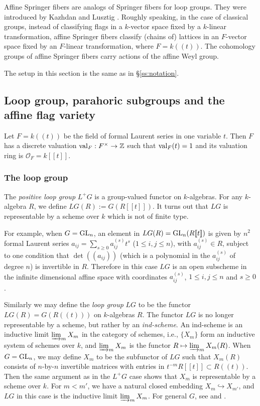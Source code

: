 \documentclass[]{pcmi}
\let\oldsubsubsection\subsubsection
\renewcommand{\subsubsection}[1]{%
\setcounter{subsubsection}{\value{equation}}%
\oldsubsubsection{#1}%
\refstepcounter{equation}%
}
\theoremstyle{plain}
\theoremstyle{definition}
\def\ZZ{\mathbb{Z}}
\def\calO{\mathcal{O}}
\newcommand{\val}{\textup{val}}
\newcommand\GL{\textup{GL}}
\newcommand{\incl}{\hookrightarrow}
\newcommand{\tl}[1]{[\![#1]\!]}
\newcommand{\lr}[1]{(\!(#1)\!)}
\begin{document}
Affine Springer fibers are analogs of Springer fibers for loop groups. They were introduced by Kazhdan and Lusztig \cite{KL}. Roughly speaking, in the case of classical groups, instead of classifying flags in a $k$-vector space fixed by a $k$-linear transformation, affine Springer fibers classify (chains of) lattices in an $F$-vector space fixed by an $F$-linear transformation, where $F=k\lr{t}$. The cohomology groups of affine Springer fibers carry actions of the affine Weyl group.

The setup in this section is the same as in \S\ref{ss:notation}.

\subsection{Loop group, parahoric subgroups and the affine flag variety}
Let $F=k\lr{t}$ be the field of formal Laurent series in one variable $t$.  Then $F$ has a discrete valuation $\val_{F}:F^{\times}\to\ZZ$ such that $\val_{F}(t)=1$ and its valuation ring is $\calO_{F}=k\tl{t}$.

\subsubsection{The loop group} The {\em positive loop group} $L^{+}G$ is a group-valued functor on $k$-algebras. For any $k$-algebra $R$, we define $LG(R):=G(R\tl{t})$. It turns out that $LG$ is representable by a scheme over $k$ which is not of finite type. 

For example, when $G=\GL_{n}$, an element in $LG(R)=\GL_{n}(R\tl{t})$ is given by $n^{2}$ formal Laurent series $a_{ij}=\sum_{s\geq 0}a^{(s)}_{ij}t^{s}$ ($1\leq i,j\leq n$), with $a^{(s)}_{ij}\in R$, subject to one condition that $\det((a_{ij}))$ (which is a polynomial in the $a^{(s)}_{ij}$ of degree $n$) is invertible in $R$. Therefore in this case $LG$ is an open subscheme in the infinite dimensional affine space with coordinates $a^{(s)}_{ij}$, $1\leq i,j\leq n$ and $s\geq 0$. 

Similarly we may define the {\em loop group} $LG$ to be the functor $LG(R)=G(R\lr{t})$ on $k$-algebras $R$. The functor $LG$ is no longer representable by a scheme, but rather by an {\em ind-scheme}. An ind-scheme is an inductive limit $\varinjlim_{m} X_{m}$ in the category of schemes, i.e., $\{X_{m}\}$ form an inductive system of schemes over $k$, and $\varinjlim_{m} X_{m}$ is the functor $R\mapsto \varinjlim_{m} X_{m}(R)$.  When $G=\GL_{n}$, we may  define $X_{m}$ to be the subfunctor of $LG$ such that $X_{m}(R)$ consists of $n$-by-$n$ invertible matrices with entries in $t^{-m}R\tl{t}\subset R\lr{t}$. Then the same argument as in the  $L^{+}G$ case shows that $X_{m}$ is representable by a scheme over $k$. For $m<m'$, we have a natural closed embedding $X_{m}\incl X_{m'}$, and $LG$ in this case is the inductive limit $\varinjlim_{m}X_{m}$.  For general $G$, see \cite[\S1]{BL} and \cite[\S2]{Faltings}.
\end{document}
